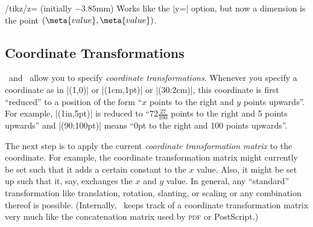 \begin{key}{/tikz/z= (initially \normalfont$-3.85$mm)}
    Works like the |y=| option, but now a dimension is the point
    $(\meta{value},\meta{value})$.
\begin{codeexample}[]
\end{codeexample}
\end{key}


\subsection{Coordinate Transformations}

\pgfname\ and \tikzname\ allow you to specify \emph{coordinate
transformations}. Whenever you specify a coordinate as in |(1,0)| or
|(1cm,1pt)| or |(30:2cm)|, this coordinate is first ``reduced'' to a position
of the form ``$x$ points to the right and $y$ points upwards''. For example,
|(1in,5pt)| is reduced to ``$72\frac{27}{100}$ points to the right and 5 points
upwards'' and |(90:100pt)| means ``0pt to the right and 100 points upwards''.

The next step is to apply the current \emph{coordinate transformation matrix}
to the coordinate. For example, the coordinate transformation matrix might
currently be set such that it adds a certain constant to the $x$ value. Also,
it might be set up such that it, say, exchanges the $x$ and $y$ value. In
general, any ``standard'' transformation like translation, rotation, slanting,
or scaling or any combination thereof is possible. (Internally, \pgfname\ keeps
track of a coordinate transformation matrix very much like the concatenation
matrix used by \textsc{pdf} or PostScript.)
%
\begin{codeexample}[]
\end{codeexample}

